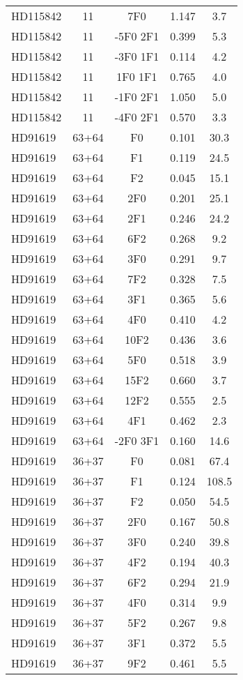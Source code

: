 \begin{table*}
\begin{tabular}{l c c c c}
HD115842 & 11 & 7F0 & 1.147 & 3.7\\ 
HD115842 & 11 & -5F0 2F1 & 0.399 & 5.3\\ 
HD115842 & 11 & -3F0 1F1 & 0.114 & 4.2\\ 
HD115842 & 11 & 1F0 1F1 & 0.765 & 4.0\\ 
HD115842 & 11 & -1F0 2F1 & 1.050 & 5.0\\ 
HD115842 & 11 & -4F0 2F1 & 0.570 & 3.3\\ 
\hline
HD91619 & 63+64 & F0 & 0.101 & 30.3\\ 
HD91619 & 63+64 & F1 & 0.119 & 24.5\\ 
HD91619 & 63+64 & F2 & 0.045 & 15.1\\ 
HD91619 & 63+64 & 2F0 & 0.201 & 25.1\\ 
HD91619 & 63+64 & 2F1 & 0.246 & 24.2\\ 
HD91619 & 63+64 & 6F2 & 0.268 & 9.2\\ 
HD91619 & 63+64 & 3F0 & 0.291 & 9.7\\ 
HD91619 & 63+64 & 7F2 & 0.328 & 7.5\\ 
HD91619 & 63+64 & 3F1 & 0.365 & 5.6\\ 
HD91619 & 63+64 & 4F0 & 0.410 & 4.2\\ 
HD91619 & 63+64 & 10F2 & 0.436 & 3.6\\ 
HD91619 & 63+64 & 5F0 & 0.518 & 3.9\\ 
HD91619 & 63+64 & 15F2 & 0.660 & 3.7\\ 
HD91619 & 63+64 & 12F2 & 0.555 & 2.5\\ 
HD91619 & 63+64 & 4F1 & 0.462 & 2.3\\ 
HD91619 & 63+64 & -2F0 3F1 & 0.160 & 14.6\\ 
\hline
HD91619 & 36+37 & F0 & 0.081 & 67.4\\ 
HD91619 & 36+37 & F1 & 0.124 & 108.5\\ 
HD91619 & 36+37 & F2 & 0.050 & 54.5\\ 
HD91619 & 36+37 & 2F0 & 0.167 & 50.8\\ 
HD91619 & 36+37 & 3F0 & 0.240 & 39.8\\ 
HD91619 & 36+37 & 4F2 & 0.194 & 40.3\\ 
HD91619 & 36+37 & 6F2 & 0.294 & 21.9\\ 
HD91619 & 36+37 & 4F0 & 0.314 & 9.9\\ 
HD91619 & 36+37 & 5F2 & 0.267 & 9.8\\ 
HD91619 & 36+37 & 3F1 & 0.372 & 5.5\\ 
HD91619 & 36+37 & 9F2 & 0.461 & 5.5\\ 

\end{tabular}
\end{table*}

